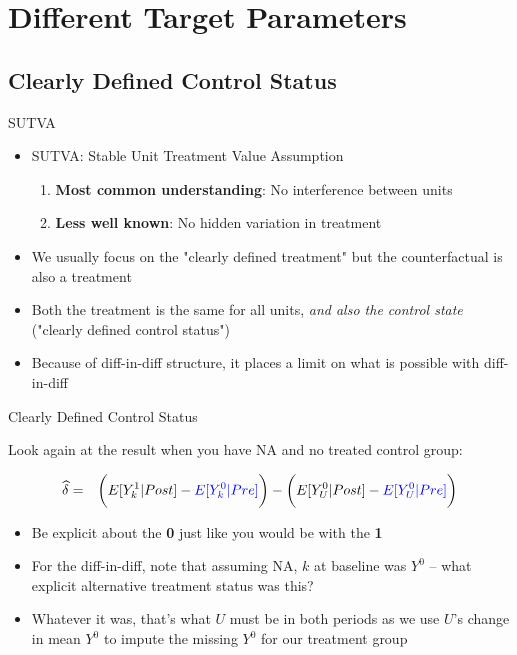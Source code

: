 \documentclass{beamer}
\begin{document}
\section{Different Target Parameters}

\subsection{Clearly Defined Control Status}

\begin{frame}{SUTVA}

\begin{itemize}
\item SUTVA: Stable Unit Treatment Value Assumption
	\begin{enumerate}
	\item \textbf{Most common understanding}: No interference between units
	\item \textbf{Less well known}: No hidden variation in treatment
	\end{enumerate}
\item We usually focus on the "clearly defined treatment" but the counterfactual is also a treatment 
\item Both the treatment is the same for all units, \emph{and also the control state} ("clearly defined control status")
\item Because of diff-in-diff structure, it places a limit on what is possible with diff-in-diff
\end{itemize}

\end{frame}

\begin{frame}{Clearly Defined Control Status}

Look again at the result when you have NA and no treated control group:

\begin{eqnarray*}
\widehat{\delta} &=& \bigg ( E[Y^1_k|Post] - \textcolor{blue}{E[Y^0_k|Pre]} \bigg ) - \bigg ( E[Y^0_U | Post ] - \textcolor{blue}{E[ Y^0_U | Pre]} \bigg) \\
\end{eqnarray*}

\begin{itemize}
\item Be explicit about the \textbf{0} just like you would be with the \textbf{1}
\item For the diff-in-diff, note that assuming NA, $k$ at baseline was $Y^0$ -- what explicit alternative treatment status was this?  
\item Whatever it was, that's what $U$ must be in both periods as we use $U$'s change in mean $Y^0$ to impute the missing $Y^0$ for our treatment group
\end{itemize}

\end{frame}
\end{document}
